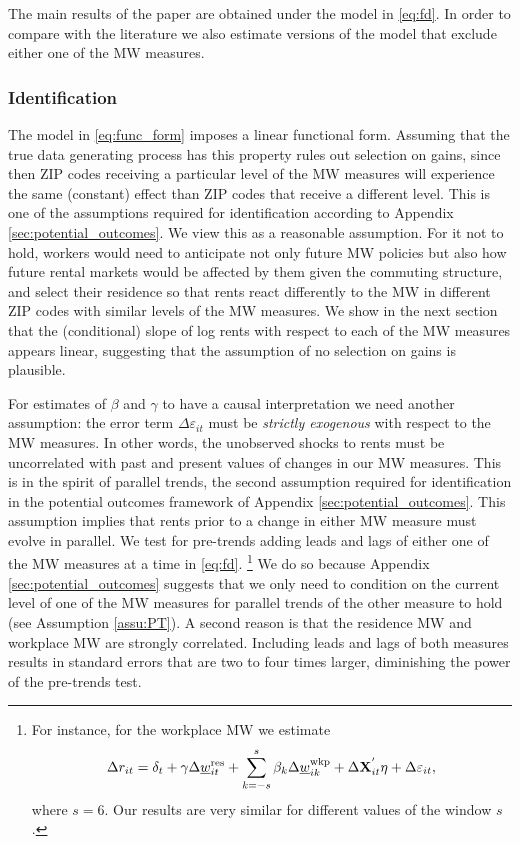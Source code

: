 The main results of the paper are obtained under the model in \eqref{eq:fd}. 
In order to compare with the literature we also estimate versions of the 
model that exclude either one of the MW measures.

\subsubsection*{Identification}

The model in \eqref{eq:func_form} imposes a linear functional form.
Assuming that the true data generating process has this property rules out 
selection on gains, since then ZIP codes receiving a particular level of the
MW measures will experience the same (constant) effect than ZIP codes that 
receive a different level.
This is one of the assumptions required for identification according to 
Appendix \ref{sec:potential_outcomes}.
We view this as a reasonable assumption.
For it not to hold, workers would need to anticipate not only future MW policies 
but also how future rental markets would be affected by them given the commuting 
structure, and select their residence so that rents react differently to the 
MW in different ZIP codes with similar levels of the MW measures.
We show in the next section that the (conditional) slope of log rents with 
respect to each of the MW measures appears linear, suggesting that the 
assumption of no selection on gains is plausible.

For estimates of $\beta$ and $\gamma$ to have a causal interpretation we need 
another assumption: the error term $\Delta\varepsilon_{it}$ must be 
\textit{strictly exogenous} with respect to the MW measures.
In other words, the unobserved shocks to rents must be uncorrelated with past 
and present values of changes in our MW measures.
This is in the spirit of parallel trends, the second assumption required for
identification in the potential outcomes framework of Appendix 
\ref{sec:potential_outcomes}.
This assumption implies that rents prior to a change in either MW measure must
evolve in parallel.
We test for pre-trends adding leads and lags of either one of the MW measures 
at a time in \eqref{eq:fd}.%
\footnote{For instance, for the workplace MW we estimate
\begin{equation*}
    \Delta r_{it} = \delta_t
                  + \gamma \Delta \underline{w}^{\text{res}}_{it} 
                  + \sum_{k=-s}^{s} \beta_k \Delta \underline{w}^{\text{wkp}}_{ik}
                  + \Delta \mathbf{X}^{'}_{it}\eta
                  + \Delta \varepsilon_{it} ,
\end{equation*}
where $s=6$.
Our results are very similar for different values of the window $s$.}
We do so because Appendix \ref{sec:potential_outcomes} suggests that we only 
need to condition on the current level of one of the MW measures for parallel 
trends of the other measure to hold (see Assumption \ref{assu:PT}).
A second reason is that the residence MW and workplace MW are strongly 
correlated.
Including leads and lags of both measures results in standard errors that are
two to four times larger, diminishing the power of the pre-trends test.

